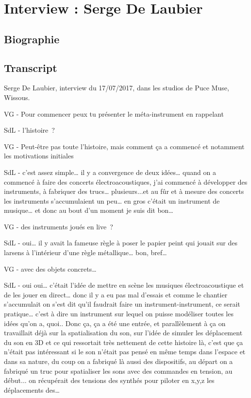 \chapter{Interview : Serge De Laubier}
\label{appendix:delaubier}
\section*{Biographie}

\section*{Transcript}
Serge De Laubier, interview du 17/07/2017, dans les studios de Puce Muse, Wissous.

VG - Pour commencer peux tu présenter le méta-instrument en rappelant 

SdL - l'histoire ? 

VG - Peut-être pas toute l'histoire, mais comment ça a commencé et notamment les motivations initiales 

SdL - c'est assez simple… il y a convergence de deux idées… quand on a commencé à faire des concerts électroacoustiques, j'ai commencé à développer des instruments, à fabriquer des trucs… plusieurs...et au fûr et à mesure des concerts les instruments s'accumulaient un peu… en gros c'était un instrument de musique… et donc au bout d'un moment je suis dit bon… 

VG - des instruments joués en live ? 

SdL - oui… il y avait la fameuse règle à poser le papier peint qui jouait sur des larsens à l'intérieur d'une règle métallique… bon, bref…  

VG - avec des objets concrets… 

SdL - oui oui… c'était l'idée de mettre en scène les musiques électroacoustique et de les jouer en direct… donc il y a eu pas mal d'essais et comme le chantier s'accumulait on s'est dit qu'il faudrait faire un instrument-instrument, ce serait pratique… c'est à dire un instrument sur lequel on puisse modéliser toutes les idées qu'on a, quoi.. Donc ça, ça a été une entrée, et parallèlement à ça on travaillait déjà sur la spatialisation du son, sur l'idée de simuler les déplacement du son en 3D et ce qui ressortait très nettement de cette histoire là, c'est que ça n'était pas intéressant si le son n'était pas pensé en même temps dans l'espace et dans sa nature, du coup on a fabriqué là aussi des dispositifs, au départ on a fabriqué un truc pour spatialiser les sons avec des commandes en tension, au début... on récupérait des tensions des synthés pour piloter en x,y,z les déplacements des… 

